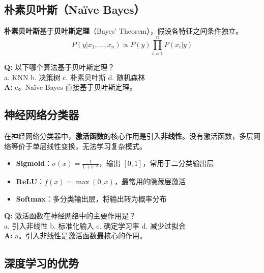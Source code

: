 \documentclass[11pt,a4paper]{article}
\begin{document}
\subsection{朴素贝叶斯（Na\"ive Bayes）}

\begin{bluebox}
\textbf{朴素贝叶斯}基于\textbf{贝叶斯定理}（Bayes' Theorem），假设各特征之间条件独立。
$$P(y|x_1, ..., x_n) \propto P(y) \prod_{i=1}^{n} P(x_i|y)$$
\end{bluebox}

\begin{examplebox}[例题：基于贝叶斯定理的算法]
\textbf{Q:} 以下哪个算法基于贝叶斯定理？\\
a. KNN \quad b. 决策树 \quad c. 朴素贝叶斯 \quad d. 随机森林\\
\textbf{A:} c。Na\"ive Bayes 直接基于贝叶斯定理。
\end{examplebox}

\subsection{神经网络分类器}

\begin{bluebox}[激活函数的作用]
在神经网络分类器中，\textbf{激活函数}的核心作用是引入\textbf{非线性}。没有激活函数，多层网络等价于单层线性变换，无法学习复杂模式。
\end{bluebox}

\begin{orangebox}[常见激活函数]
\begin{itemize}
    \item \textbf{Sigmoid}：$\sigma(x) = \frac{1}{1+e^{-x}}$，输出 $[0,1]$，常用于二分类输出层
    \item \textbf{ReLU}：$f(x) = \max(0, x)$，最常用的隐藏层激活
    \item \textbf{Softmax}：多分类输出层，将输出转为概率分布
\end{itemize}
\end{orangebox}

\begin{examplebox}[例题：激活函数的作用]
\textbf{Q:} 激活函数在神经网络中的主要作用是？\\
a. 引入非线性 \quad b. 标准化输入 \quad c. 确定学习率 \quad d. 减少过拟合\\
\textbf{A:} a。引入非线性是激活函数最核心的作用。
\end{examplebox}

\subsection{深度学习的优势}
\end{document}
